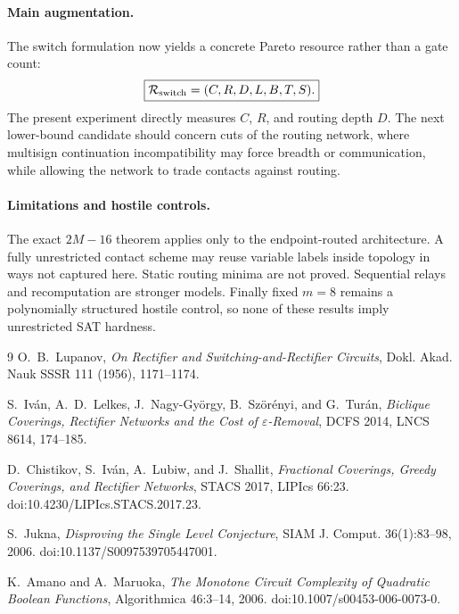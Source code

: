\paragraph{Main augmentation.}
The switch formulation now yields a concrete Pareto resource rather than a gate count:
\[
\boxed{
\mathcal R_{\rm switch}
=
(C,R,D,L,B,T,S).
}
\]
The present experiment directly measures \(C\), \(R\), and routing depth \(D\).
The next lower-bound candidate should concern cuts of the routing network, where
multisign continuation incompatibility may force breadth or communication, while allowing
the network to trade contacts against routing.

\paragraph{Limitations and hostile controls.}
The exact \(2M-16\) theorem applies only to the endpoint-routed architecture. A fully
unrestricted contact scheme may reuse variable labels inside topology in ways not captured
here. Static routing minima are not proved. Sequential relays and recomputation are stronger
models. Finally fixed \(m=8\) remains a polynomially structured hostile control, so none of
these results imply unrestricted SAT hardness.

\begin{thebibliography}{9}
O.~B.~Lupanov,
\emph{On Rectifier and Switching-and-Rectifier Circuits},
Dokl. Akad. Nauk SSSR 111 (1956), 1171--1174.

S.~Iv\'an, A.~D.~Lelkes, J.~Nagy-Gy\"orgy, B.~Sz\"or\'enyi, and G.~Tur\'an,
\emph{Biclique Coverings, Rectifier Networks and the Cost of \(\varepsilon\)-Removal},
DCFS 2014, LNCS 8614, 174--185.

D.~Chistikov, S.~Iv\'an, A.~Lubiw, and J.~Shallit,
\emph{Fractional Coverings, Greedy Coverings, and Rectifier Networks},
STACS 2017, LIPIcs 66:23.
doi:10.4230/LIPIcs.STACS.2017.23.

S.~Jukna,
\emph{Disproving the Single Level Conjecture},
SIAM J. Comput. 36(1):83--98, 2006.
doi:10.1137/S0097539705447001.

K.~Amano and A.~Maruoka,
\emph{The Monotone Circuit Complexity of Quadratic Boolean Functions},
Algorithmica 46:3--14, 2006.
doi:10.1007/s00453-006-0073-0.
\end{thebibliography}

